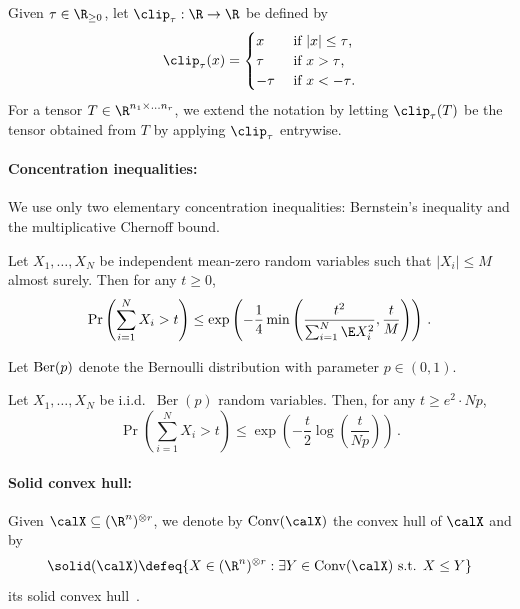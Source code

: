 \documentclass[11pt,a4paper]{article}
\begin{document}
\begin{definition}[Clip]
    Given $\tau\in \R_{\ge 0}$, 
    let $\clip_\tau:\R\to \R$ be
    defined by
    \[
        \clip_\tau(x) =\begin{cases}
            x & \text{ if $|x|\le\tau$,}\\ \tau & \text{ if $x>\tau$,}\\
            -\tau & \text{ if $x<-\tau$.}
        \end{cases}
    \]
    For a tensor $T\in \R^{n_1\times\ldots n_r}$, we extend
    the notation by letting
    $\clip_\tau(T)$ be the tensor
    obtained from $T$
    by applying $\clip_\tau$
    entrywise.
\end{definition}

\paragraph{Concentration inequalities:} We use only
two elementary concentration
inequalities: Bernstein's inequality
and the multiplicative Chernoff bound.

\begin{lemma}\label{lem:bernstein}
    Let $X_1, \ldots, X_N$ be
    independent mean-zero random variables
    such that $|X_i|\le M$ almost
    surely. Then for any $t\ge 0$,
    \[
        \Pr\left(\sum_{i=1}^N X_i >t\right)\le \exp\left(-\frac 14 \min\left(\frac {t^2}{\sum_{i=1}^N \E X_i^2}, \frac t {M}\right)\right)\,.
    \]
\end{lemma}

Let $\textnormal{Ber}(p)$ denote
the Bernoulli distribution with parameter $p\in (0,1)$. 

\begin{lemma}\label{lemma:chernoff}
    Let $X_1, \ldots, X_N$ be i.i.d.\ $\operatorname{Ber}(p)$ random variables. Then, for any  $t \ge e^2\cdot Np$, 
    \[
        \Pr\left(\sum_{i=1}^N X_i > t\right) \leq \exp \left(-\frac{t}{2}\log \left( \frac{t}{Np} \right) \right)\,.
    \]
\end{lemma}

\paragraph{Solid convex hull:}
Given $\calX \subseteq (\R^n)^{\otimes r}$, we 
denote by $\operatorname{Conv}(\calX)$ the convex hull of $\calX$
and by
\[
    \solid(\calX) \defeq \{X\in (\R^n)^{\otimes r} : \exists Y \in \operatorname{Conv}(\calX) \text{ s.t. } X\le Y\}
\]
its solid convex hull~\cite{talagrandChaining}.
\end{document}
